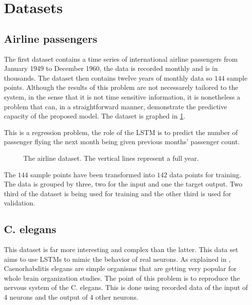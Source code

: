 \section{Datasets}

\subsection{Airline passengers}

The first dataset contains a time series of international airline passengers from January 1949 to December 1960, the data is recorded monthly and is in thousands. The dataset then contains twelve years of monthly data so $144$ sample points. Although the results of this problem are not necessarely tailored to the system, in the sense that it is not time sensitive information, it is nonetheless a problem that can, in a straightforward manner, demonstrate the predictive capacity of the proposed model. The dataset is graphed in \cref{graph:airline}.

This is a regression problem, the role of the \ac{LSTM} is to predict the number of passenger flying the next month being given previous months' passenger count.

\begin{figure}[h]
  \centering
  
  \caption{The airline dataset. The vertical lines represent a full year.}
  \label{graph:airline}
\end{figure}

The $144$ sample points have been transformed into $142$ data points for training. The data is grouped by three, two for the input and one the target output. Two third of the dataset is being used for training and the other third is used for validation.

\subsection{C. elegans}

This dataset is far more interesting and complex than the latter. This data set aims to use \acp{LSTM} to mimic the behavior of real neurons. As explained in \cite{celegans}, Caenorhabditis elegans are simple organisms that are getting very popular for whole brain organization studies. The point of this problem is to reproduce the nervous system of the \ac{C. elegans}. This is done using recorded data of the input of 4 neurons and the output of 4 other neurons.

